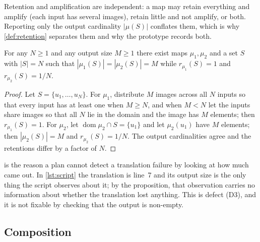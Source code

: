 Retention and amplification are independent: a map may retain everything and
amplify (each input has several images), retain little and not amplify, or
both. Reporting only the output cardinality $|\mu(S)|$ conflates them, which is
why \cref{def:retention} separates them and why the prototype records both.

\begin{proposition}
\label{prop:cardinality-uninformative}
For any $N \geq 1$ and any output size $M \geq 1$ there exist maps $\mu_1,\mu_2$
and a set $S$ with $|S| = N$ such that
$|\mu_1(S)| = |\mu_2(S)| = M$ while $r_{\mu_1}(S) = 1$ and
$r_{\mu_2}(S) = 1/N$.
\end{proposition}

\begin{proof}
Let $S = \{u_1,\dots,u_N\}$. For $\mu_1$, distribute $M$ images across all $N$
inputs so that every input has at least one when $M \geq N$, and when $M < N$
let the inputs share images so that all $N$ lie in the domain and the image has
$M$ elements; then $r_{\mu_1}(S)=1$. For $\mu_2$, let
$\operatorname{dom}\mu_2 \cap S = \{u_1\}$ and let $\mu_2(u_1)$ have $M$
elements; then $|\mu_2(S)| = M$ and $r_{\mu_2}(S) = 1/N$. The output
cardinalities agree and the retentions differ by a factor of $N$.
\end{proof}

 is the reason a plan cannot detect a
translation failure by looking at how much came out. In \cref{lst:script} the
translation is line~7 and its output size is the only thing the script observes
about it; by the proposition, that observation carries no information about
whether the translation lost anything. This is defect (D3), and it is not
fixable by checking that the output is non-empty.

\subsection{Composition}

